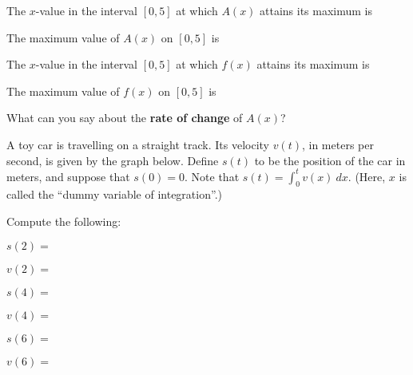 \documentclass[11pt,fleqn]{article}
\begin{document}
The $x$-value in the interval $[0,5]$  at which $A(x)$ attains its maximum is \hrulefill
\vfill

The maximum value of $A(x)$ on $[0,5]$ is \hrulefill
\vfill

The  $x$-value in the interval $[0,5]$  at which $f(x)$ attains its maximum is \hrulefill
\vfill

The maximum value of $f(x)$ on $[0,5]$ is \hrulefill
\vfill

What can you say about the {\bf rate of change} of $A(x)$? 
\vfill

\newpage


\item %

A toy car is travelling on a straight track. Its velocity $v(t)$, in meters per second, is given by the graph below. Define $s(t)$ to be the position of the car in meters, and suppose that $s(0) = 0$. Note that $s(t)= \displaystyle{\int_{0}^{t}} v(x) \ dx$. (Here, $x$ is called the ``dummy variable of integration''.)
%

\begin{center}
\end{center}

Compute the following:
\begin{multicols}{3}
$s(2) = $ \hrulefill

$v(2) = $ \hrulefill

$s(4) = $ \hrulefill

$v(4) = $ \hrulefill

$s(6) = $ \hrulefill

$v(6) = $ \hrulefill

\end{multicols}
\end{document}
